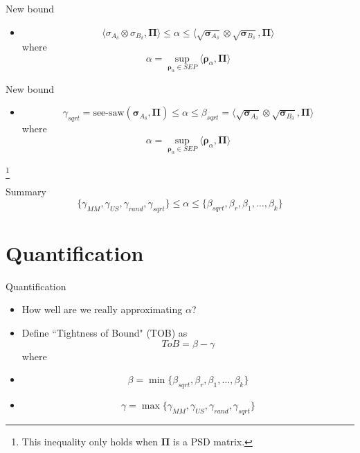 \documentclass{beamer}
\begin{document}
    \begin{frame}{New bound}
        \begin{itemize}
            \item[] 
            $$
                \langle\sigma_{A_{\delta}}\otimes\sigma_{B_{\delta}}, \mathbf{\Pi}\rangle \le \alpha \le \langle\sqrt{\mathbf{\sigma}_{A_{\delta}}}\otimes\sqrt{\mathbf{\sigma}_{B_{\delta}}}, \mathbf{\Pi}\rangle
            $$
            where
            $$
                \alpha = \sup\limits_{\mathbf{\rho}_{\alpha} \in SEP}\langle\mathbf{\rho}_{\alpha}, \mathbf{\Pi}\rangle
            $$
        \end{itemize}
    \end{frame}
    
    \begin{frame}{New bound}
        \begin{itemize}
            \item[] 
            $$
                \gamma_{sqrt} = \mbox{see-saw}(\mathbf{\sigma}_{A_{\delta}}, \mathbf{\Pi}) \le \alpha \le \beta_{sqrt} = \langle\sqrt{\mathbf{\sigma}_{A_{\delta}}}\otimes\sqrt{\mathbf{\sigma}_{B_{\delta}}}, \mathbf{\Pi}\rangle
            $$
            where
            $$
                \alpha = \sup\limits_{\mathbf{\rho}_{\alpha} \in SEP}\langle\mathbf{\rho}_{\alpha}, \mathbf{\Pi}\rangle
            $$
        \end{itemize}
        \footnote{This inequality only holds when $\mathbf{\Pi}$ is a PSD matrix.}
    \end{frame}
    
    \begin{frame}{Summary}
        $$
            \{\gamma_{MM}, \gamma_{US}, \gamma_{rand}, \gamma_{sqrt}\} \le \alpha \le \{\beta_{sqrt}, \beta_{r}, \beta_{1}, \dots, \beta_{k}\}
        $$
    \end{frame}
    
    \section{Quantification}
        \begin{frame}{Quantification}
            \begin{itemize}
                \item[] How well are we really approximating $\alpha$?
                \item[] Define ``Tightness of Bound" (TOB) as
                $$
                    ToB = \beta - \gamma
                $$
                where
                \item[] 
                $$
                    \beta = \min\{\beta_{sqrt}, \beta_{r}, \beta_{1}, \dots, \beta_{k}\}
                $$
                \item[]
                $$
                    \gamma = \max\{\gamma_{MM}, \gamma_{US}, \gamma_{rand}, \gamma_{sqrt}\}
                $$
            \end{itemize}
        \end{frame}
    
\end{document}
